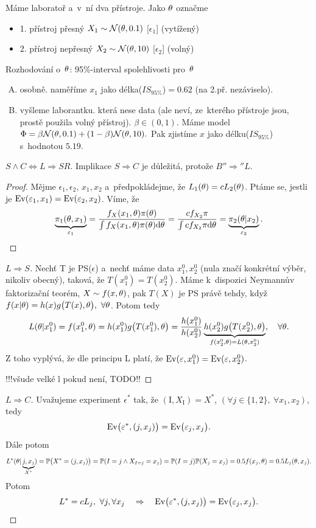 \begin{example}
	Máme laboratoř a~v~ní dva přístroje. Jako $\theta$ označme\begin{itemize}
		\item 1. přístroj přesný $X_1\sim\mathcal{N}(\theta,0.1)$ [$\epsilon_1$] (vytížený)
		\item 2. přístroj nepřesný $X_2\sim\mathcal{N}(\theta,10)$ [$\epsilon_2$] (volný)
	\end{itemize}
Rozhodování o~$\theta$: 95\%-interval spolehlivosti pro~$\theta$\begin{enumerate}[A)]
	\item osobně. naměříme $x_1$ jako délka($IS_{95\%}$)$=0.62$ (na 2.př. nezáviselo).
	\item vyšleme laborantku. která nese data (ale neví, ze~kterého přístroje jsou, prostě použila volný přístroj). $\beta\in(0,1)$. Máme model $\Phi=\beta\mathcal{N}(\theta,0.1)+(1-\beta)\mathcal{N}(\theta,10).$ Pak zjistíme $x$ jako délku($IS_{95\%}$) s~hodnotou $5.19$.
\end{enumerate}
\end{example}
\begin{theorem}
	$S\wedge C\Leftrightarrow L\Rightarrow SR$. Implikace $S\Rightarrow C$ je důležitá, protože $B''\Rightarrow'' L$.
	\begin{proof}
		Mějme $\epsilon_1,\epsilon_2$, $x_1,x_2$ a~předpokládejme, že $L_1(\theta)=c L_2(\theta)$. Ptáme se, jestli je $\mathrm{Ev}(\varepsilon_1,x_1)=\mathrm{Ev}(\varepsilon_2,x_2)$. Víme, že $$ \underbrace{\pi_1(\theta,x_1)}_{\varepsilon_1}=\frac{f_X(x_1,\theta)\pi(\theta)}{\int f_X(x_1,\theta)\pi(\theta)\mathrm{d}\theta}=\frac{c f_{X_2}\pi}{\int c f_{X_2}\pi\mathrm{d}\theta}=\underbrace{\pi_2(\theta| x_2)}_{\varepsilon_2}.$$
	\end{proof}
\begin{proof}[$L\Rightarrow S$]
	Nechť T je PS($\epsilon$) a~nechť máme data $x_1^0,x_2^0$ (nula značí konkrétní výběr, nikoliv obecný), taková, že $T(x_1^0)=T(x_2^0)$. Máme k~dispozici Neymannův faktorizační teorém, $X\sim f(x,\theta)$, pak $T(X)$ je PS právě tehdy, když $f(x|\theta)=h(x)g\big(T(x),\theta \big),~\forall\theta$. Potom tedy 
	$$ L(\theta|x_1^0)=f(x_1^0,\theta)=h(x_1^0)g\big( T(x_1^0),\theta \big)=\frac{h(x_1^0)}{h(x_2^0)}\underbrace{h(x_2^0)g\big(T(x_2^0),\theta \big)}_{f(x_2^0,\theta)=L(\theta,x_2^0)},\quad\forall\theta.$$
	Z toho vyplývá, že dle principu L platí, že $\mathrm{Ev}(\varepsilon,x_1^0)=\mathrm{Ev}(\varepsilon,x_2^0)$.
	
	
	!!!všude velké l pokud není, TODO!!
\end{proof}
\begin{proof}[$L\Rightarrow C$]
Uvažujeme experiment $\epsilon^*$ tak, že $(\mathrm{I},X_\mathrm{I})=X^*$, $(\forall j\in\{1,2\},~\forall x_1,x_2)$, tedy $$\mathrm{Ev}\big(\varepsilon^*,(j,x_j) \big)=\mathrm{Ev}\big(\varepsilon_j,x_j \big).$$
Dále potom $$ L^*(\theta|\underbrace{j,x_j}_{X^*})=\mathbb{P}\big(X^*=(j,x_j) \big)=\mathbb{P}(I=j\wedge X_{I=j}=x_j)=\mathbb{P}(I=j)\mathbb{P}(X_j=x_j)=0.5f(x_j,\theta)=0.5 L_j(\theta,x_j).$$
Potom 
$$L^*=c L_j,~ \forall j,\forall x_j\quad\Rightarrow\quad\mathrm{Ev}\big(\varepsilon^*,(j,x_j) \big)=\mathrm{Ev}\big(\varepsilon_j,x_j \big).$$
\end{proof}
\end{theorem}

